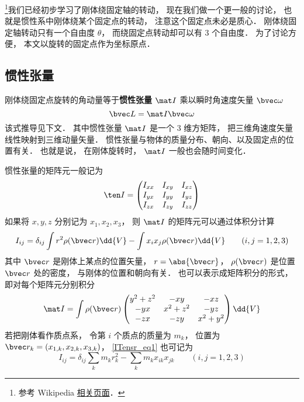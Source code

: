 
\begin{issues}
\issueTODO
\end{issues}


\footnote{参考 Wikipedia \href{https://en.wikipedia.org/wiki/Moment_of_inertia}{相关页面}．}我们已经初步学习了刚体绕固定轴的转动， 现在我们做一个更一般的讨论， 也就是惯性系中刚体绕某个固定点的转动， 注意这个固定点未必是质心． 刚体绕固定轴转动只有一个自由度 $\theta$， 而绕固定点转动却可以有 3 个自由度． 为了讨论方便， 本文以旋转的固定点作为坐标原点．

\subsection{惯性张量}
刚体绕固定点旋转的角动量等于\textbf{惯性张量} $\mat I$ 乘以瞬时角速度矢量 $\bvec \omega$
\begin{equation}\label{ITensr_eq3}
\bvec L = \mat I \bvec \omega
\end{equation}
该式推导见下文． 其中惯性张量 $\mat I$ 是一个 3 维方矩阵， 把三维角速度矢量线性映射到三维动量矢量． 惯性张量与物体的质量分布、朝向、以及固定点的位置有关． 也就是说， 在刚体旋转时， $\mat I$ 一般也会随时间变化．

惯性张量的矩阵元一般记为
\begin{equation}
\ten I = \begin{pmatrix}
I_{xx}& I_{xy}& I_{xz} \\
I_{yx}& I_{yy}& I_{yz} \\
I_{zx}& I_{zy}& I_{zz}
\end{pmatrix}
\end{equation}
如果将 $x, y, z$ 分别记为 $x_1, x_2, x_3$， 则 $\mat I$ 的矩阵元可以通过体积分计算
\begin{equation}\label{ITensr_eq1}
I_{ij} = \delta_{ij} \int r^2 \rho(\bvec r)\dd{V} - \int x_i x_j \rho(\bvec r)\dd{V} \qquad (i, j = 1, 2, 3)
\end{equation}
其中 $\bvec r$ 是刚体上某点的位置矢量， $r = \abs{\bvec r}$， $\rho(\bvec r)$ 是位置 $\bvec r$ 处的密度， 与刚体的位置和朝向有关． 也可以表示成矩阵积分的形式， 即对每个矩阵元分别积分
\begin{equation}\label{ITensr_eq2}
\mat I = \int \rho(\bvec r)
\begin{pmatrix}
y^2 + z^2 & -xy & -xz\\
-yx & x^2 + z^2 & -yz\\
-zx & -zy & x^2 + y^2
\end{pmatrix}
\dd{V}
\end{equation}
若把刚体看作质点系， 令第 $i$ 个质点的质量为 $m_k$， 位置为 $\bvec r_{k} = (x_{1,k},x_{2,k},x_{3,k})$， \autoref{ITensr_eq1} 也可记为
\begin{equation}\label{ITensr_eq8}
I_{ij} = \delta_{ij}\sum_k m_k r_k^2 - \sum_k m_k x_{ik}x_{jk} \qquad (i, j = 1, 2, 3)
\end{equation}

